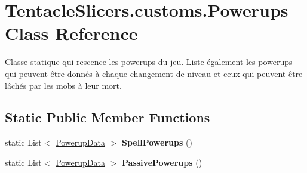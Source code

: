 \hypertarget{class_tentacle_slicers_1_1customs_1_1_powerups}{}\section{Tentacle\+Slicers.\+customs.\+Powerups Class Reference}
\label{class_tentacle_slicers_1_1customs_1_1_powerups}


Classe statique qui rescence les powerups du jeu. Liste également les powerups qui peuvent être donnés à chaque changement de niveau et ceux qui peuvent être lâchés par les mobs à leur mort.  


\subsection*{Static Public Member Functions}
\begin{DoxyCompactItemize}
\item 
\mbox{\label{class_tentacle_slicers_1_1customs_1_1_powerups_a3a478e7963542151d0918ab04f593d83}} 
static List$<$ \hyperlink{class_tentacle_slicers_1_1actors_1_1_powerup_data}{Powerup\+Data} $>$ {\bfseries Spell\+Powerups} ()
\item 
\mbox{\label{class_tentacle_slicers_1_1customs_1_1_powerups_aafef7382eab3338213cdc9385ecfeb11}} 
static List$<$ \hyperlink{class_tentacle_slicers_1_1actors_1_1_powerup_data}{Powerup\+Data} $>$ {\bfseries Passive\+Powerups} ()
\end{DoxyCompactItemize}
